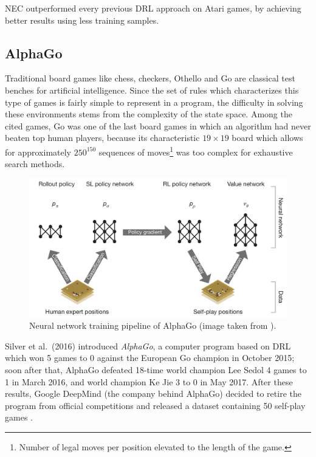 NEC outperformed every previous DRL approach on Atari games, by achieving better
results using less training samples.

\subsection{AlphaGo}
Traditional board games like chess, checkers, Othello and Go are classical 
test benches for artificial intelligence. Since the set of rules which
characterizes this type of games is fairly simple to represent in a program, the
difficulty in solving these environments stems from the complexity of the 
state space. Among the cited games, Go was one of the last board games in which 
an algorithm had never beaten top human players, because its characteristic 
$19 \times 19$ board which allows for approximately $250^{150}$ sequences of
moves\footnote{Number of legal moves per position elevated to the length of the 
game.} was too complex for exhaustive search methods.
%
\begin{figure}[h]
\includegraphics[width=\textwidth]{pictures/alphago}
\centering
\caption[Neural network training pipeline of AlphaGo]{Neural network training 
						      pipeline of AlphaGo
						      (image taken from 
						      \cite{silver2016mastering}).}
\label{f:alphago}
\end{figure}
%

Silver et al.\ (2016) \cite{silver2016mastering} introduced \textit{AlphaGo}, 
a computer program based on DRL which won 5 games to 0 against the European Go 
champion in October 2015; soon after that, AlphaGo defeated 18-time world 
champion Lee Sedol 4 games to 1 in March 2016, and world champion Ke Jie 3 to 0 
in May 2017. After these results, Google DeepMind (the company behind 
AlphaGo) decided to retire the program from official competitions and released a
dataset containing 50 self-play games \cite{alphago}.

